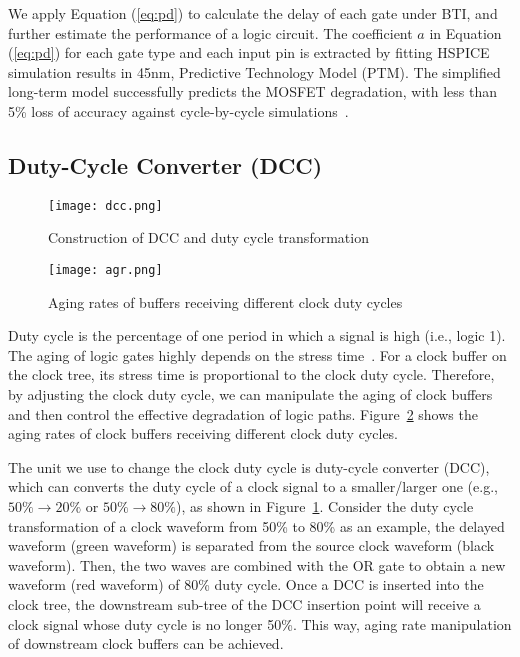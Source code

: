 We apply Equation (\ref{eq:pd}) to calculate the delay of each gate under BTI, and further estimate the performance of a logic circuit. The coefficient $a$ in Equation (\ref{eq:pd}) for each gate type and each input pin is extracted by fitting HSPICE simulation results in 45nm, Predictive Technology Model (PTM). The simplified long-term model successfully predicts the MOSFET degradation, with less than 5\% loss of accuracy against cycle-by-cycle simulations~\cite{wang2007efficient, wang2010impact, gomez2016early}.

\subsection{Duty-Cycle Converter (DCC)}
\begin{figure}
    \centering
    \texttt{[image: dcc.png]} %
    \caption{Construction of DCC and duty cycle transformation}
    \label{fig:dcc}
\end{figure}

\begin{figure}
    \centering
    \texttt{[image: agr.png]} %
    \caption{Aging rates of buffers receiving different clock duty cycles}
    \label{fig:agr}
\end{figure}

Duty cycle is the percentage of one period in which a signal is high (i.e., logic 1). The aging of logic gates highly depends on the stress time~\cite{wang2010impact}. For a clock buffer on the clock tree, its stress time is proportional to the clock duty cycle. Therefore, by adjusting the clock duty cycle, we can manipulate the aging of clock buffers and then control the effective degradation of logic paths. Figure~\ref{fig:agr} shows the aging rates of clock buffers receiving different clock duty cycles. 

The unit we use to change the clock duty cycle is duty-cycle converter (DCC), which can converts the duty cycle of a clock signal to a smaller/larger one (e.g., $50\% \rightarrow 20\%$ or $50\% \rightarrow 80\%$), as shown in Figure~\ref{fig:dcc}. Consider the duty cycle transformation of a clock waveform from 50\% to 80\% as an example, the delayed waveform (green waveform) is separated from the source clock waveform (black waveform). Then, the two waves are combined with the OR gate to obtain a new waveform (red waveform) of 80\% duty cycle. Once a DCC is inserted into the clock tree, the downstream sub-tree of the DCC insertion point will receive a clock signal whose duty cycle is no longer 50\%. This way, aging rate manipulation of downstream clock buffers can be achieved.


